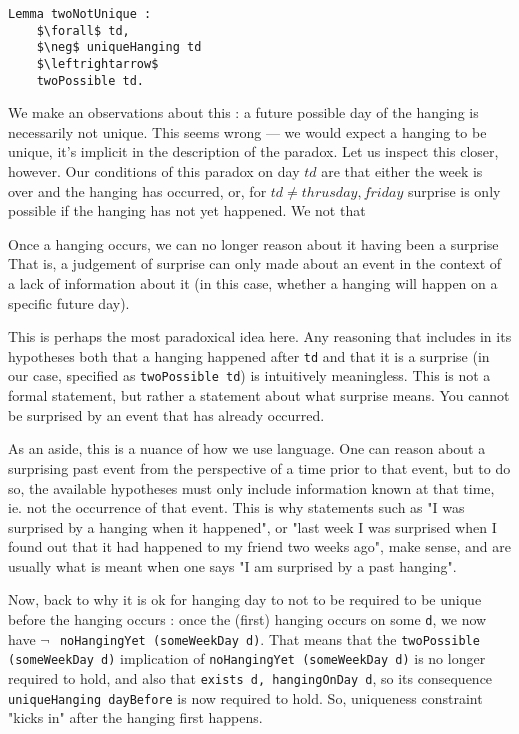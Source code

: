 \documentclass[journal]{journal}
\begin{document}
\begin{lstlisting}[mathescape=true]
  Lemma twoNotUnique :
    $\forall$ td,
    $\neg$ uniqueHanging td
    $\leftrightarrow$
    twoPossible td.
\end{lstlisting}

We make an observations about this : a future possible day of the hanging is
necessarily not unique. This seems wrong --- we would expect a hanging to be
unique, it's implicit in the
description of the paradox. Let us inspect this closer, however.
Our conditions of this paradox on day $td$ are that either
the week is over and the hanging has occurred, or, for $td \neq thrusday, friday$ surprise is
only possible if the hanging has not yet happened. We not that

Once a hanging occurs, we can no longer reason about it having been a surprise
That is, a judgement of surprise can only made about
an event in the context of a lack of information about it (in this case,
whether a hanging will happen on a specific future day).

This is perhaps the most paradoxical idea here. Any reasoning that includes
in its hypotheses both that a hanging happened after {\tt td} and that it is a surprise
(in our case, specified as {\tt twoPossible td}) is intuitively meaningless. This is not a
formal statement, but rather a statement about what surprise means. You cannot
be surprised by an event that has already occurred.

As an aside, this is a nuance of how we use language. One can reason about a surprising past
event from the perspective of a time prior to that event, but to do so,
the available hypotheses must only include information known at that time, ie.
not the occurrence of that event. This is why statements such as "I was surprised
by a hanging when it happened", or "last week I was surprised when I found out
that it had happened to my friend two weeks ago", make sense, and are usually
what is meant when one says "I am surprised by a past hanging".

Now, back to why it is ok for hanging day to not to be required to be unique
before the hanging occurs : once the (first) hanging
occurs on some {\tt d}, we now have {\tt $\neg~$ noHangingYet (someWeekDay d)}.
That means that the {\tt twoPossible (someWeekDay d)} implication of {\tt noHangingYet (someWeekDay d)}
is no longer required to hold, and also that {\tt exists d, hangingOnDay d}, so
its consequence {\tt uniqueHanging dayBefore} is now required to hold.
So, uniqueness constraint "kicks in" after the hanging first happens.
\end{document}
